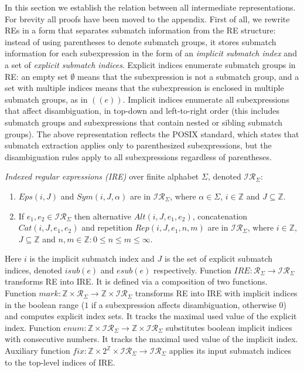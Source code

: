 \documentclass[AMA,STIX1COL]{WileyNJD-v2}
\newcommand{\XI}{\mathcal{I}}
\newcommand{\XIR}{\XI\!\XR}
\newcommand{\XR}{\mathcal{R}}
\newcommand{\YZ}{\mathbb{Z}}
\newcommand{\IRE}{I\!RE}
\newcommand{\Eps}{E\!ps}
\newcommand{\Sym}{S\!ym}
\newcommand{\Alt}{Alt}
\newcommand{\Cat}{C\!at}
\newcommand{\Rep}{Rep}
\newcommand{\fix}{f\!ix}
\newcommand{\isub}{\mathit{isub}}
\begin{document}
In this section we establish the relation between all intermediate representations.
For brevity all proofs have been moved to the appendix.
%
First of all, we rewrite REs in a form that separates submatch information from the RE structure:
instead of using parentheses to denote submatch groups,
it stores submatch information for each subexpression in the form of an \emph{implicit submatch index} and a set of \emph{explicit submatch indices}.
Explicit indices enumerate submatch groups in RE:
an empty set $\emptyset$ means that the subexpression is not a submatch group,
and a set with multiple indices means that the subexpression is enclosed in multiple submatch groups, as in $((e))$.
Implicit indices enumerate all subexpressions that affect disambiguation, in top-down and left-to-right order
(this includes submatch groups and subexpressions that contain nested or sibling submatch groups).
The above representation reflects the POSIX standard, which states that
submatch extraction applies only to parenthesized subexpressions,
but the disambiguation rules apply to all subexpressions regardless of parentheses.

    \begin{definition}\label{defire}
    \emph{Indexed regular expressions (IRE)} over finite alphabet $\Sigma$, denoted $\XIR_\Sigma$:
    \begin{enumerate}
        \item
          $\Eps(i, J)$ and $\Sym(i, J, \alpha)$ are in $\XIR_\Sigma$,
          where $\alpha \in \Sigma$,
          $i \in \YZ$
          and $J \subseteq \YZ$.

        \item If $e_1, e_2 \in \XIR_\Sigma$ then
          alternative $\Alt(i, J, e_1, e_2)$,
          concatenation $\Cat(i, J, e_1, e_2)$ and
          repetition $\Rep(i, J, e_1, n, m)$
          are in $\XIR_\Sigma$, where
          $i \in \YZ$,
          $J \subseteq \YZ$
          and $n, m \in \YZ: 0 \leq n \leq m \leq \infty$.
    \end{enumerate}
    \end{definition}

Here $i$ is the implicit submatch index
and $J$ is the set of explicit submatch indices, denoted $\isub(e)$ and $esub(e)$ respectively.
Function $\IRE: \XR_\Sigma \rightarrow \XIR_\Sigma$ transforms RE into IRE.
It is defined via a composition of two functions.
Function $mark: \YZ \times \XR_\Sigma \longrightarrow \YZ \times \XIR_\Sigma$
transforms RE into IRE with implicit indices in the boolean range ($1$ if a subexpression affects disambiguation, otherwise $0$)
and computes explicit index sets. It tracks the maximal used value of the explicit index.
Function $enum: \YZ \times \XIR_\Sigma \longrightarrow \YZ \times \XIR_\Sigma$
substitutes boolean implicit indices with consecutive numbers. It tracks the maximal used value of the implicit index.
Auxiliary function $\fix: \YZ \times 2^{\YZ} \times \XIR_\Sigma \longrightarrow \XIR_\Sigma$
applies its input submatch indices to the top-level indices of IRE.
\end{document}

